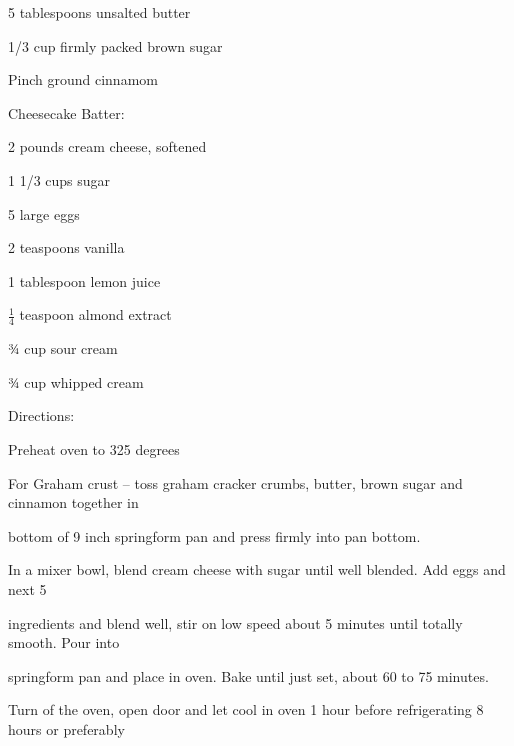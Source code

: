 \documentclass[a4paper,portrait,12pt]{book}
\begin{document}
5 tablespoons unsalted butter




1/3 cup firmly packed brown sugar




Pinch ground cinnamom




Cheesecake Batter:




2 pounds cream cheese, softened




1 1/3 cups sugar




5 large eggs




2 teaspoons vanilla




1 tablespoon lemon juice




$\frac{1}{4}$ teaspoon almond extract




¾ cup sour cream




¾ cup whipped cream







Directions:




Preheat oven to 325 degrees




For Graham crust -- toss graham cracker crumbs, butter, brown sugar and cinnamon together in




bottom of 9 inch springform pan and press firmly into pan bottom.




In a mixer bowl, blend cream cheese with sugar until well blended. Add eggs and next 5




ingredients and blend well, stir on low speed about 5 minutes until totally smooth. Pour into




springform pan and place in oven. Bake until just set, about 60 to 75 minutes.




Turn of the oven, open door and let cool in oven 1 hour before refrigerating 8 hours or preferably
\end{document}
